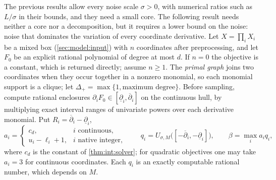 The previous results allow every noise scale $\sigma>0$, with numerical
ratios such as $L/\sigma$ in their bounds, and they need a small core. The
following result needs neither a core nor a decomposition, but it requires a
lower bound on the noise: noise that dominates the variation of every
coordinate derivative. Let $X=\prod_iX_i$ be a mixed box
(\cref{sec:model:input}) with $n$ coordinates after preprocessing, and let
$F_0$ be an explicit rational polynomial of degree at most $d$. If $n=0$ the
objective is a constant, which is returned directly; assume $n\ge1$. The
\emph{primal graph} joins two coordinates when they occur together in a
nonzero monomial, so each monomial support is a clique; let
$\Delta_+=\max\{1,\text{maximum degree}\}$. Before sampling, compute rational
enclosures $\partial_iF_0\in[\underline\partial_i,\overline\partial_i]$ on the
continuous hull, by multiplying exact interval ranges of univariate powers
over each derivative monomial. Put $R_i=\overline\partial_i-\underline\partial_i$,
\[
 a_i=\begin{cases}c_d,&i\text{ continuous},\\u_i-\ell_i+1,&i\text{ native integer},
 \end{cases}\qquad
 q_i=U_{\sigma,M}\bigl([-\overline\partial_i,-\underline\partial_i]\bigr),\qquad
 \beta=\max_ia_iq_i,
\]
where $c_d$ is the constant of \cref{thm:int:solver}; for quadratic
objectives one may take $a_i=3$ for continuous coordinates. Each $q_i$ is an
exactly computable rational number, which depends on $M$.

